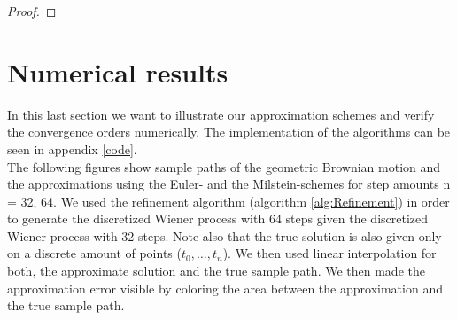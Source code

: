 \begin{proof}
\end{proof}

\section{Numerical results}
\label{results}
In this last section we want to illustrate our approximation schemes and verify the convergence orders numerically. The implementation of the algorithms can be seen in appendix \ref{code}.\\
The following figures show sample paths of the geometric Brownian motion and the approximations using the Euler- and the Milstein-schemes for step amounts n = 32, 64. We used the refinement algorithm (algorithm \ref{alg:Refinement}) in order to generate the discretized Wiener process with 64 steps given the discretized Wiener process with 32 steps. Note also that the true solution is also given only on a discrete amount of points (\(t_0,\ldots,t_n\)). We then used linear interpolation for both, the approximate solution and the true sample path. We then made the approximation error visible by coloring the area between the approximation and the true sample path.

